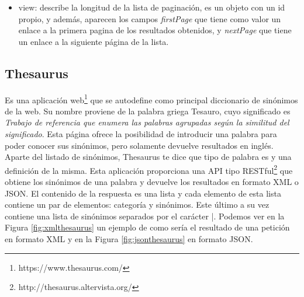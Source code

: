 \begin{itemize}
\begin{itemize}
		\item sources: indica por qué ConceptNet guarda esa información, este campo como los anteriores, es un objeto que tiene su propio id y un campo @type, A parte, hay un campo \textit{contributor}, en el que aparece la fuente por la que se ha obtenido ese resultado y por último un campo \textit{process} indicando si la palabra se ha añadido mediante un proceso automático.
		\item start: describe el nodo origen, es decir, la palabra que hemos introducido en ConceptNet para que haga la consulta, este campo esta compuesto por elementos ya descritos como son: @id, @type, label, language y term.
		\item surfaceText: indica de que frase del lenguaje natural se han extraido los datos que estan guardados en conceptnet. En nuestro caso es nulo.
		\item weight: indica la fiabilidad de la información guardada en conceptnet, siendo normal que su valor sea 1.0. Cuanto mayor sea este valor, más fiables serán.
	\end{itemize}
	\item view: describe la longitud de la lista de paginación, es un objeto con un id propio, y además, aparecen los campos \textit{firstPage} que tiene como valor un enlace a la primera pagina de los resultados obtenidos, y \textit{nextPage} que tiene un enlace a la siguiente página de la lista.
\end{itemize}


\subsection{Thesaurus}
\label{cap:subsec:thesaurus}
Es una aplicación web\footnote{https://www.thesaurus.com/} que se autodefine como principal diccionario de sinónimos de la web. Su nombre proviene de la palabra griega Tesauro, cuyo significado es \textit{Trabajo de referencia que enumera las palabras agrupadas según la similitud del significado}. Esta página ofrece la posibilidad de introducir una palabra para poder conocer sus sinónimos, pero solamente devuelve resultados en inglés. Aparte del listado de sinónimos,  Thesaurus te dice que tipo de palabra es y una definición de la misma.
Esta aplicación proporciona una API tipo RESTful\footnote{http://thesaurus.altervista.org/} que obtiene los sinónimos de una palabra y devuelve los resultados en formato XML o JSON. El contenido de la respuesta es una lista y cada elemento de esta lista contiene un par de elementos: categoría y sinónimos. Este último a su vez contiene una lista de sinónimos separados por el carácter |. 
Podemos ver en la Figura \ref{fig:xmlthesaurus} un ejemplo de como sería el resultado de una petición en formato XML y en la Figura \ref{fig:jsonthesaurus} en formato JSON.

